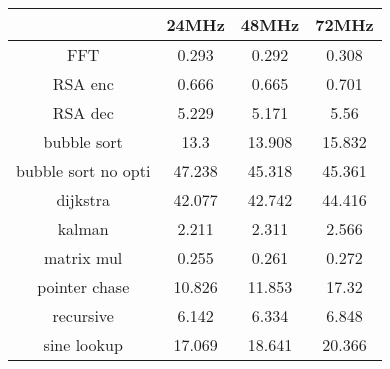\begin{table}[!ht]
    \centering
    \begin{tabular}{||c c c c||}
    \hline
        ~ & 24MHz & 48MHz & 72MHz \\[0.5ex]  \hline \hline
        FFT & 0.293 & 0.292 & 0.308 \\ 
        RSA enc & 0.666 & 0.665 & 0.701 \\ 
        RSA dec & 5.229 & 5.171 & 5.56 \\ 
        bubble sort & 13.3 & 13.908 & 15.832 \\ 
        bubble sort no opti & 47.238 & 45.318 & 45.361 \\ 
        dijkstra & 42.077 & 42.742 & 44.416 \\ 
        kalman & 2.211 & 2.311 & 2.566 \\ 
        matrix mul & 0.255 & 0.261 & 0.272 \\ 
        pointer chase & 10.826 & 11.853 & 17.32 \\ 
        recursive & 6.142 & 6.334 & 6.848 \\ 
        sine lookup & 17.069 & 18.641 & 20.366 \\ [1ex]
        \hline
    \end{tabular}
\end{table}